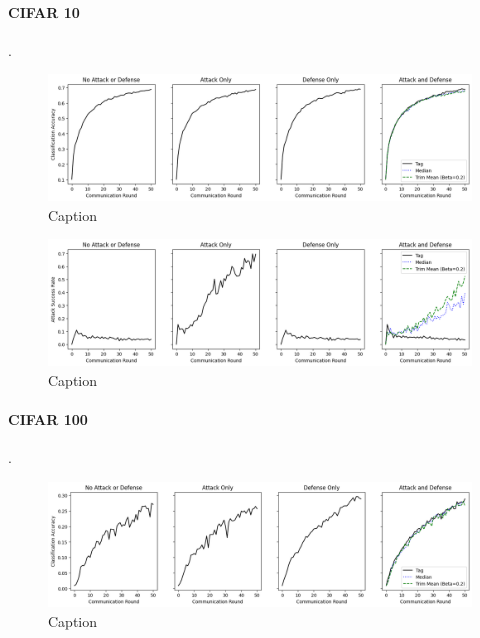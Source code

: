\documentclass{article} %
\begin{document}
%
\paragraph{CIFAR 10}.

\begin{figure}[H]
    \centering
    \includegraphics[width=\textwidth]{cifar_10/classic/tag/centralized/alpha10000--alpha_val10000/visuals/clean_accuracy--n_malicious1--beta0.2.png}
    \caption{Caption}
    \label{fig:my_label}
\end{figure}

\begin{figure}[H]
    \centering
    \includegraphics[width=\textwidth]{cifar_10/classic/tag/centralized/alpha10000--alpha_val10000/visuals/pois_accuracy--n_malicious1--beta0.2.png}
    \caption{Caption}
    \label{fig:my_label}
\end{figure}


%
\paragraph{CIFAR 100}.

\begin{figure}[H]
    \centering
    \includegraphics[width=\textwidth]{cifar_100/classic/tag/centralized/alpha10000--alpha_val10000/visuals/clean_accuracy--n_malicious1--beta0.2.png}
    \caption{Caption}
    \label{fig:my_label}
\end{figure}
\end{document}
